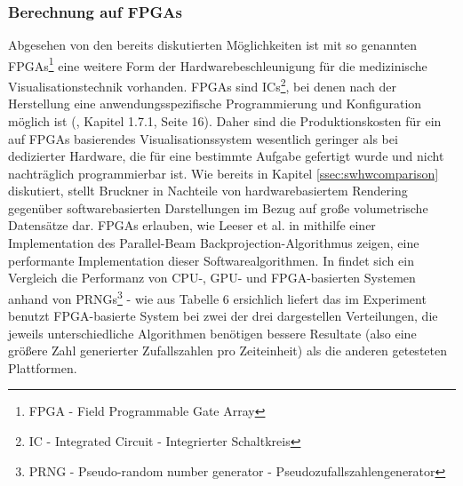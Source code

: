\documentclass[pdftex,a4paper,titlepage,12pt]{scrartcl}
\newtheorem[L]{boxedDefinition}{Definition}
\begin{document}
\subsubsection{Berechnung auf FPGAs}\label{sssec:fpgacalculation}
Abgesehen von den bereits diskutierten Möglichkeiten ist mit so genannten FPGAs\footnote{FPGA - Field Programmable Gate Array} eine weitere Form der Hardwarebeschleunigung für die medizinische Visualisationstechnik vorhanden. FPGAs sind ICs\footnote{IC - Integrated Circuit - Integrierter Schaltkreis}, bei denen nach der Herstellung eine anwendungsspezifische Programmierung und Konfiguration möglich ist (\cite{Kibritev2009}, Kapitel 1.7.1, Seite 16). Daher sind die Produktionskosten für ein auf FPGAs basierendes Visualisationssystem wesentlich geringer als bei dedizierter Hardware, die für eine bestimmte Aufgabe gefertigt wurde und nicht nachträglich programmierbar ist. Wie bereits in Kapitel \vref{ssec:swhwcomparison} diskutiert, stellt Bruckner in \cite{Bruckner2004} Nachteile von hardwarebasiertem Rendering gegenüber softwarebasierten Darstellungen im Bezug auf große volumetrische Datensätze dar. FPGAs erlauben, wie Leeser et al. in \cite{Leeser2005} mithilfe einer Implementation des Parallel-Beam Backprojection-Algorithmus zeigen, eine performante Implementation dieser Softwarealgorithmen. In \cite{Thomas2009} findet sich ein Vergleich die Performanz von CPU-, GPU- und FPGA-basierten Systemen anhand von PRNGs\footnote{PRNG - Pseudo-random number generator - Pseudozufallszahlengenerator} - wie aus Tabelle 6 ersichlich liefert das im Experiment benutzt FPGA-basierte System bei zwei der drei dargestellen Verteilungen, die jeweils unterschiedliche Algorithmen benötigen bessere Resultate (also eine größere Zahl generierter Zufallszahlen pro Zeiteinheit) als die anderen getesteten Plattformen.
\end{document}
